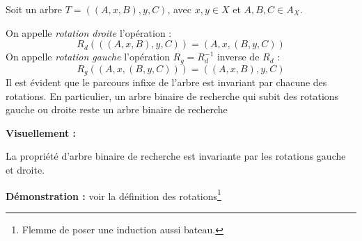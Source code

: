 \documentclass[../../../main.tex]{subfiles}
\begin{document}
 {
	Soit un arbre $T = ((A, x, B), y, C)$, avec $x,y \in X$ et $A, B, C\in A_X$.\newline

	On appelle \textit{rotation droite} l'opération :
	$$R_d(((A, x, B), y, C)) = (A, x, (B, y, C))$$
	On appelle \textit{rotation gauche} l'opération $R_g = R_d^{-1}$ inverse de $R_d$ :
	$$R_g((A, x, (B, y, C))) = ((A, x, B), y, C)$$
	Il est évident que le parcours infixe de l'arbre est invariant par chacune des rotations. En particulier, un arbre binaire de recherche qui subit des rotations gauche ou droite reste un arbre binaire de recherche
}
\textbf{Visuellement :} \begin{center}
		
	\end{center}
 La propriété d'arbre binaire de recherche est invariante par les rotations gauche et droite.

\textbf{Démonstration :} voir la définition des rotations\footnote{Flemme de poser une induction aussi bateau.}
\end{document}

